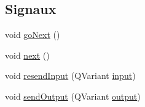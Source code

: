 \subsection*{Signaux}
\begin{DoxyCompactItemize}
\item 
void \hyperlink{classSimpleHotel_1_1SH__GenericState_a5afea8cc17017b08b8db6d51b5bcefc4}{go\-Next} ()
\item 
void \hyperlink{classSimpleHotel_1_1SH__GenericState_a0ff6668857baab63d4f13c4d7175acbd}{next} ()
\item 
void \hyperlink{classSimpleHotel_1_1SH__InOutState_ab259648430e9e6e0667e79398c68c0d9}{resend\-Input} (Q\-Variant \hyperlink{classSimpleHotel_1_1SH__InOutState_a487d2ca6200fed372b1a27cfa27774db}{input})
\item 
void \hyperlink{classSimpleHotel_1_1SH__InOutState_a6f39ba3a9682ece4a0d2c96e8f8983a0}{send\-Output} (Q\-Variant \hyperlink{classSimpleHotel_1_1SH__InOutState_a71b15e4d49b9c2aa540500065ceb39da}{output})
\end{DoxyCompactItemize}
